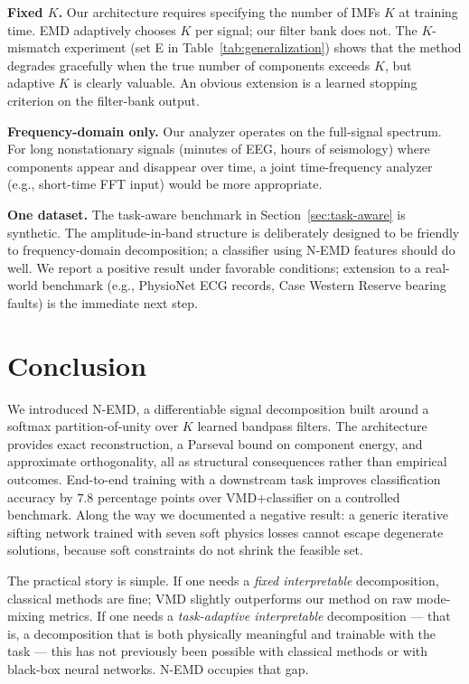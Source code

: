 \documentclass[journal]{IEEEtran}
\begin{document}
\textbf{Fixed $K$.} Our architecture requires specifying the number of IMFs $K$ at training time. EMD adaptively chooses $K$ per signal; our filter bank does not. The $K$-mismatch experiment (set E in Table~\ref{tab:generalization}) shows that the method degrades gracefully when the true number of components exceeds $K$, but adaptive $K$ is clearly valuable. An obvious extension is a learned stopping criterion on the filter-bank output.

\textbf{Frequency-domain only.} Our analyzer operates on the full-signal spectrum. For long nonstationary signals (minutes of EEG, hours of seismology) where components appear and disappear over time, a joint time-frequency analyzer (e.g., short-time FFT input) would be more appropriate.

\textbf{One dataset.} The task-aware benchmark in Section~\ref{sec:task-aware} is synthetic. The amplitude-in-band structure is deliberately designed to be friendly to frequency-domain decomposition; a classifier using N-EMD features should do well. We report a positive result under favorable conditions; extension to a real-world benchmark (e.g., PhysioNet ECG records, Case Western Reserve bearing faults) is the immediate next step.

\section{Conclusion}
\label{sec:conclusion}

We introduced N-EMD, a differentiable signal decomposition built around a softmax partition-of-unity over $K$ learned bandpass filters. The architecture provides exact reconstruction, a Parseval bound on component energy, and approximate orthogonality, all as structural consequences rather than empirical outcomes. End-to-end training with a downstream task improves classification accuracy by $7.8$ percentage points over VMD+classifier on a controlled benchmark. Along the way we documented a negative result: a generic iterative sifting network trained with seven soft physics losses cannot escape degenerate solutions, because soft constraints do not shrink the feasible set.

The practical story is simple. If one needs a \emph{fixed interpretable} decomposition, classical methods are fine; VMD slightly outperforms our method on raw mode-mixing metrics. If one needs a \emph{task-adaptive interpretable} decomposition --- that is, a decomposition that is both physically meaningful and trainable with the task --- this has not previously been possible with classical methods or with black-box neural networks. N-EMD occupies that gap.
\end{document}
